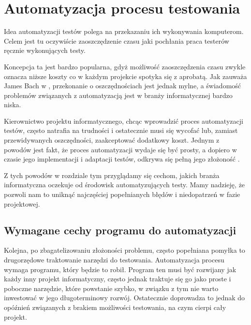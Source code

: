 \documentclass[00-praca-magisterska.tex]{subfiles}
\begin{document}
\chapter{Automatyzacja procesu testowania}
\label{automatyzacja}

Idea automatyzacji testów polega na przekazaniu ich wykonywania komputerom.
Celem jest tu oczywiście zaoszczędzenie czasu jaki pochłania praca testerów
ręcznie wykonujących testy.

Koncepcja ta jest bardzo popularna, gdyż możliwość zaoszczędzenia czasu zwykle
oznacza niższe koszty co w każdym projekcie spotyka się z aprobatą. Jak zauważa
James Bach w \cite{snake-oil}, przekonanie o oszczędnościach jest jednak mylne,
a świadomość problemów związanych z automatyzacją jest w branży informatycznej
bardzo niska.

Kierownictwo projektu informatycznego, chcąc wprowadzić proces automatyzacji
testów, często natrafia na trudności i ostatecznie musi się wycofać lub,
zamiast przewidywanych oszczędności, zaakceptować dodatkowy koszt. Jednym z
powodów jest fakt, że proces automatyzacji wydaje się być prosty, a dopiero w
czasie jego implementacji i adaptacji testów, odkrywa się pełną jego złożoność
\cite{automation-fail}.

Z tych powodów w rozdziale tym przyglądamy się cechom, jakich branża
informatyczna oczekuje od środowisk automatyzujących testy. Mamy nadzieję, że
pozwoli nam to uniknąć najczęściej popełnianych błędów i niedopatrzeń w fazie
projektowej.

\section{Wymagane cechy programu do automatyzacji}
\label{cechy-programu-do-automatyzacji}

Kolejna, po zbagatelizowaniu złożoności problemu, często popełniana pomyłka to
drugorzędowe traktowanie narzędzi do testowania. Automatyzacja procesu wymaga
programu, który będzie to robił.  Program ten musi być rozwijany jak każdy inny
projekt informatyczny, często jednak traktuje się go jako proste i poboczne
narzędzie, które powstanie szybko, w związku z tym nie warto inwestować w jego
długoterminowy rozwój.  Ostatecznie doprowadza to jednak do opóźnień związanych
z brakiem możliwości testowania, na czym cierpi cały projekt.  
\end{document}
